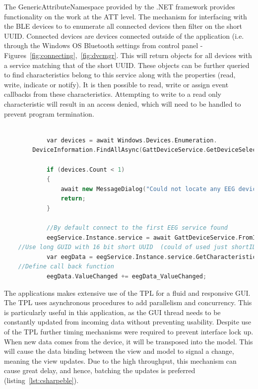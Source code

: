 \documentclass[]{article}
\begin{document}
The GenericAttributeNamespace provided by the .NET framework provides functionality on the work at the \ac{ATT} level. The mechanism for interfacing with the \ac{BLE} devices to to enumerate all connected devices then filter on the short \ac{UUID}. Connected devices are devices connected outside of the application (i.e. through the Windows OS Bluetooth settings from control panel - Figures~\ref{fig:connecting},~\ref{fig:dvcmgr}. This will return objects for all devices with a service matching that of the short \ac{UUID}. These objects can be further queried to find characteristics belong to this service along with the properties (read, write, indicate or notify). It is then possible to read, write or assign event callbacks from these characteristics. Attempting to write to a read only characteristic will result in an access denied, which will need to be handled to prevent program termination.  

\begin{lstlisting}[language=C++, caption=Connecting to a \ac{BLE} device's \ac{EEG} service ,label={lst:csharpeble}]

            var devices = await Windows.Devices.Enumeration.
		DeviceInformation.FindAllAsync(GattDeviceService.GetDeviceSelectorFromShortId(0xEEE0));

            if (devices.Count < 1)
            {
                await new MessageDialog("Could not locate any EEG devices in the vinicity").ShowAsync();
                return;
            }

            //By default connect to the first EEG service found
            eegService.Instance.service = await GattDeviceService.FromIdAsync(devices[0].Id);
	//Use long GUID with 16 bit short UUID  (could of used just shortID) 
            var eegData = eegService.Instance.service.GetCharacteristics(new Guid("0000EEE1-0000-1000-8000-00805f9b34fb"))[0];
	//Define call back function
            eegData.ValueChanged += eegData_ValueChanged;

\end{lstlisting}

The applications makes extensive use of the \ac{TPL} for a fluid and responsive \ac{GUI}. The \ac{TPL} uses asynchronous procedures to add parallelism and concurrency. This is particularly useful in this application, as the \ac{GUI} thread needs to be constantly updated from incoming data without preventing usability. Despite use of the \ac{TPL} further timing mechanisms were required to prevent interface lock up. When new data comes from the device, it will be transposed into the model. This will cause the data binding between the view and model to signal a change, meaning the view updates. Due to the high throughput, this mechanism can cause great delay, and hence, batching the updates is preferred (listing~\ref{lst:csharpeble}).
\end{document}
